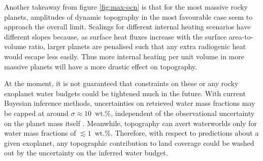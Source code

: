 \documentclass[trackchanges]{aastex63}
\newcommand{\todo}[1]{\textit{\textcolor{violet}{{#1}}}}
\begin{document}
Another takeaway from figure \ref{fig:max-ocn} is that for the most massive rocky planets, amplitudes of dynamic topography in the most favourable case seem to approach the overall limit. Scalings for different internal heating scenarios have different slopes because, as surface heat fluxes increase with the surface area-to-volume ratio, larger planets are penalised such that any extra radiogenic heat would escape less easily. Thus more internal heating per unit volume in more massive planets will have a more drastic effect on topography. 


At the moment, it is not guaranteed that constraints on these or any rocky exoplanet water budgets could be tightened much in the future. With current Bayesian inference methods, uncertainties on retrieved water mass fractions may be capped at around $\sigma \approx 10$~wt.\%, independent of the observational uncertainty on the planet mass itself \citep{otegi_impact_2020}. Meanwhile, topography can avert waterworlds only for water mass fractions of $\lesssim 1$~wt.\%. Therefore, with respect to predictions about a given exoplanet, any topographic contribution to land coverage could be washed out by the uncertainty on the inferred water budget.



 
 
\end{document}
